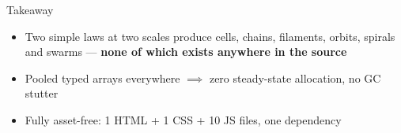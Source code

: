 \documentclass[10pt]{beamer}
\begin{document}
\begin{frame}{Takeaway}
	\begin{itemize}
		\item Two simple laws at two scales produce cells, chains, filaments, orbits, spirals and swarms ---
		      \textbf{none of which exists anywhere in the source}
		\item Pooled typed arrays everywhere $\implies$ zero steady-state allocation, no GC stutter
		\item Fully asset-free: 1 HTML + 1 CSS + 10 JS files, one dependency
	\end{itemize}
\end{frame}

\backmatter
\end{document}

